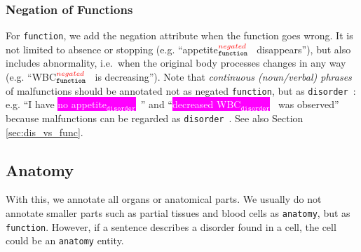 \documentclass[12pt]{article}
\theoremstyle{definition}
\newcommand{\disorder}[1]{\colorbox{fuchsia}{\textcolor{white}{#1$_{\texttt{disorder}}$}}\ }
\newcommand{\functionNeg}[1]{\colorbox{banana}{#1$_{\texttt{function}}^{\textcolor{red}{negated}}$}\ }
\newcommand{\dis}{\texttt{disorder}\ }
\begin{document}
\subsubsection{Negation of Functions}\label{sec:neg_func}


For \texttt{function}, we add the negation attribute when the function goes wrong.
It is not limited to absence or stopping (e.g. ``\functionNeg{appetite} disappears''), but also includes abnormality, i.e.~when the original body processes changes in any way (e.g. ``\functionNeg{WBC} is decreasing'').
Note that \emph{continuous (noun/verbal) phrases} of malfunctions should be annotated not as negated \texttt{function}, but as \dis: e.g. ``I have \disorder{no appetite}'' and ``\disorder{decreased WBC} was observed'' because malfunctions can be regarded as \dis. See also Section \ref{sec:dis_vs_func}.

% 


\subsection{Anatomy}\label{ent_anatomy}

With this, we annotate all organs or anatomical parts.
We usually do not annotate smaller parts such as partial tissues and blood cells as \texttt{anatomy}, but as \texttt{function}. 
However, if a sentence describes a disorder found in a cell, the cell could be an \texttt{anatomy} entity.
\end{document}
